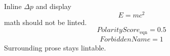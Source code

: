 Inline $\Delta p$ and display \[E = mc^2\] math should not be linted.
\begin{equation}
  PolarityScore_{\text{eqn}} = 0.5
\end{equation}
\begin{align*}
  ForbiddenName = 1
\end{align*}
Surrounding prose stays lintable.
